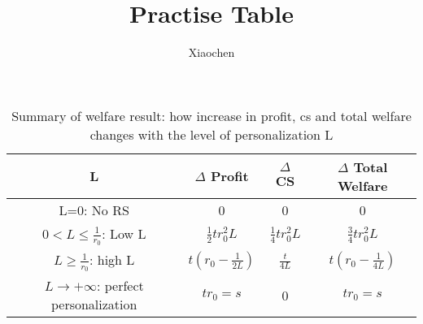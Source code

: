 \documentclass[11pt, oneside]{article}   	%
\title{Practise Table}
\author{Xiaochen}
\begin{document}
\maketitle
\begin{table}[h]
\begin{tabular}[h]{|c|c|c|c|}
\hline 
L &  $\Delta$ Profit  & $\Delta$ CS & $\Delta$ Total Welfare \\
\hline \hline
L=0: No RS & 0 & 0&0\\
\hline
$0<L\leq \frac{1}{r_0} $: Low L & $\frac{1}{2} tr_0^2L$ & $\frac{1}{4}tr_0^2L$&$\frac{3}{4}tr_0^2L$\\
\hline
$L \geq \frac{1}{r_0}$: high L & $t(r_0 -\frac{1}{2L})$ & $\frac{t}{4L}$&$t(r_0 - \frac{1}{4L})$ \\
\hline
$L\to +\infty$: perfect personalization&$tr_0=s$&0&$tr_0=s$\\
\hline
\end{tabular}
\caption{Summary of welfare result: how increase in profit, cs and total welfare changes with the level of personalization L}
\label{tab:comp3welfare}
\end{table}
\end{document}
